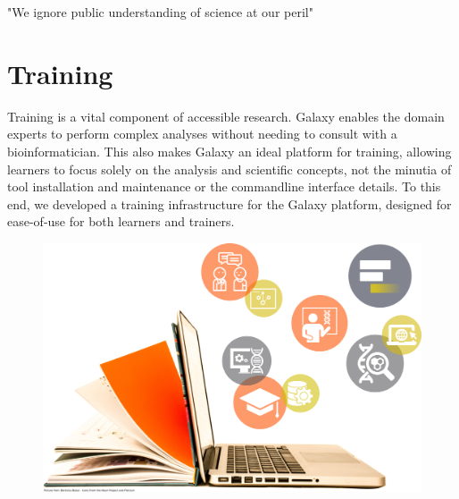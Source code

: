 \begin{savequote}[75mm]
"We ignore public understanding of science at our peril"
\end{savequote}

\chapter{Training}
\label{chapter:training}

Training is a vital component of accessible research. Galaxy enables the domain experts to perform complex analyses without needing to consult with a bioinformatician. This also makes Galaxy an ideal platform for training, allowing learners to focus solely on the analysis and scientific concepts, not the minutia of tool installation and maintenance or the commandline interface details. To this end, we developed a training infrastructure for the Galaxy platform, designed for ease-of-use for both learners and trainers.

\begin{figure}[t!]
\includegraphics[scale=0.1]{chapters/images/training-coverart.jpg}
\end{figure}
\setcounter{figure}{-1}
\setcounter{table}{-1}
\setcounter{section}{-1}
